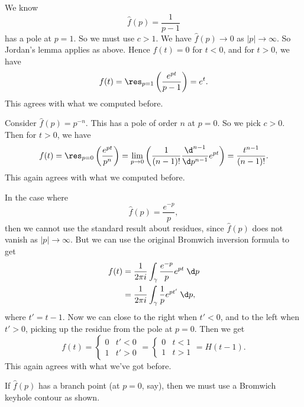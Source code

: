 \documentclass[a4paper]{article}
\begin{document}
\begin{eg}
  We know
  \[
    \hat{f}(p) = \frac{1}{p - 1}
  \]
  has a pole at $p = 1$. So we must use $c > 1$. We have $\hat{f}(p) \to 0$ as $|p| \to \infty$. So Jordan's lemma applies as above. Hence $f(t) = 0$ for $t < 0$, and for $t > 0$, we have
  \[
    f(t) = \res_{p = 1} \left(\frac{e^{pt}}{p - 1}\right) = e^t.
  \]
  This agrees with what we computed before.
\end{eg}

\begin{eg}
  Consider $\hat{f}(p) = p^{-n}$. This has a pole of order $n$ at $p = 0$. So we pick $c > 0$. Then for $t > 0$, we have
  \[
    f(t) = \res_{p = 0}\left(\frac{e^{pt}}{p^n}\right) = \lim_{p \to 0} \left(\frac{1}{(n - 1)!} \frac{\d^{n - 1}}{\d p^{n - 1}} e^{pt}\right) = \frac{t^{n - 1}}{(n - 1)!}.
  \]
  This again agrees with what we computed before.
\end{eg}

\begin{eg}
  In the case where
  \[
    \hat{f}(p) = \frac{e^{-p}}{p},
  \]
  then we cannot use the standard result about residues, since $\hat{f}(p)$ does not vanish as $|p| \to \infty$. But we can use the original Bromwich inversion formula to get
  \begin{align*}
    f(t) &= \frac{1}{2\pi i} \int_\gamma \frac{e^{-p}}{p} e^{pt}\;\d p\\
    &= \frac{1}{2\pi i} \int_\gamma \frac{1}{p} e^{pt'}\;\d p,
  \end{align*}
  where $t' = t - 1$. Now we can close to the right when $t' < 0$, and to the left when $t' > 0$, picking up the residue from the pole at $p = 0$. Then we get
  \[
    f(t) =
    \begin{cases}
      0 & t' < 0\\
      1 & t' > 0
    \end{cases}
    =
    \begin{cases}
      0 & t< 1\\
      1 & t > 1
    \end{cases} = H(t - 1).
  \]
  This again agrees with what we've got before.
\end{eg}

\begin{eg}
  If $\hat{f}(p)$ has a branch point (at $p = 0$, say), then we must use a Bromwich keyhole contour as shown.
  \begin{center}
  \end{center}
\end{eg}
\end{document}
